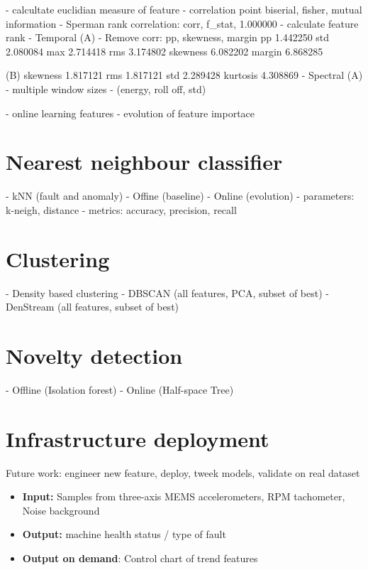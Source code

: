 	- calcultate euclidian measure of feature 
	- correlation point biserial, fisher, mutual information
		- Sperman rank correlation: corr, f_stat, 1.000000
	- calculate feature rank
		- Temporal (A) - Remove corr: pp, skewness, margin
			pp	1.442250
			std	2.080084
			max	2.714418
			rms	3.174802
			skewness	6.082202
			margin	6.868285
			
			(B)			
			skewness	1.817121
			rms	1.817121
			std	2.289428
			kurtosis	4.308869
		- Spectral (A) - multiple window sizes 
			- (energy, roll off, std) 

- online learning features
	- evolution of feature importace

\section{Nearest neighbour classifier}
- kNN (fault and anomaly)
	- Offine (baseline)
	- Online (evolution)
- parameters: k-neigh, distance
- metrics: accuracy, precision, recall

\section{Clustering}
- Density based clustering
	- DBSCAN (all features, PCA, subset of best)
	- DenStream (all features, subset of best)

\section{Novelty detection}
- Offline (Isolation forest)
- Online (Half-space Tree)


\section{Infrastructure deployment}
Future work: engineer new feature, deploy, tweek models, validate on real dataset

 \begin{itemize}
 \itemsep0pt
\item \textbf{Input:} Samples from three-axis MEMS accelerometers, RPM tachometer, Noise background
\item \textbf{Output:} machine health status / type of fault
\item \textbf{Output on demand}: Control chart of trend features
\end{itemize}

